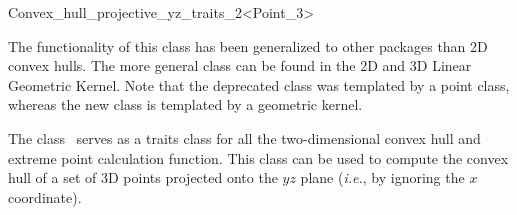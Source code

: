 
\ccAutoIndexingOff
\begin{ccRefClass}{Convex_hull_projective_yz_traits_2<Point_3>}
\ccAutoIndexingOn
{}


The functionality of this class has been generalized to other packages than 2D convex hulls.
The more general class  can be found in the 2D and 3D Linear Geometric Kernel.
Note that the deprecated class was templated by a point class, whereas the new class
is templated by a geometric kernel.

\begin{ccDeprecated}
\ccDefinition
  
The class \ccRefName\ serves as a traits class for all the two-dimensional
convex hull and extreme point calculation function.   This class can be
used to compute the convex hull of a set of 3D points projected onto the
$yz$ plane (\textit{i.e.}, by ignoring the $x$ coordinate).


\ccIsModel

%
 \\

\ccTypes
\ccAutoIndexingOff
{}
\ccThreeToTwo

\ccGlue
{}
\ccGlue
{}
\ccGlue
{}
\ccGlue
{}
\ccGlue
{}
\ccGlue
{}

\ccCreation
{}  %


\end{ccDeprecated}
\end{ccRefClass}
